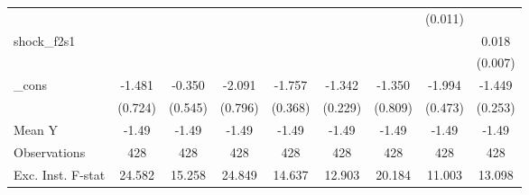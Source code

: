 {\begin{tabular}{l*{8}{c}}
            &                     &                     &                     &                     &                     &                     &     (0.011)         &                     \\
\addlinespace
shock\_f2s1  &                     &                     &                     &                     &                     &                     &                     &       0.018\sym{**} \\
            &                     &                     &                     &                     &                     &                     &                     &     (0.007)         \\
\addlinespace
\_cons      &      -1.481\sym{*}  &      -0.350         &      -2.091\sym{**} &      -1.757\sym{***}&      -1.342\sym{***}&      -1.350         &      -1.994\sym{***}&      -1.449\sym{***}\\
            &     (0.724)         &     (0.545)         &     (0.796)         &     (0.368)         &     (0.229)         &     (0.809)         &     (0.473)         &     (0.253)         \\
\midrule
Mean Y      &       -1.49         &       -1.49         &       -1.49         &       -1.49         &       -1.49         &       -1.49         &       -1.49         &       -1.49         \\
Observations&         428         &         428         &         428         &         428         &         428         &         428         &         428         &         428         \\
Exc. Inst. F-stat&      24.582         &      15.258         &      24.849         &      14.637         &      12.903         &      20.184         &      11.003         &      13.098         \\
\bottomrule
\end{tabular}
}
